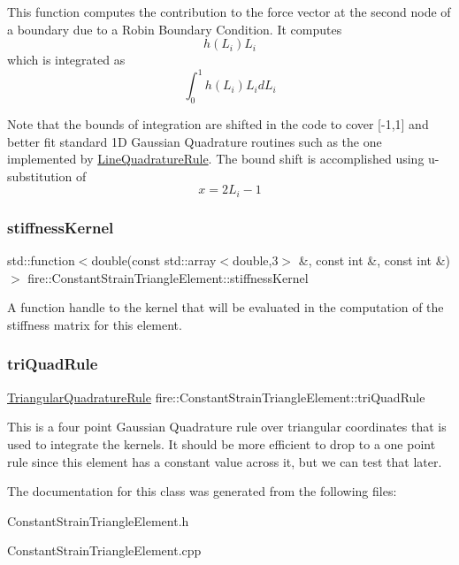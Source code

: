 This function computes the contribution to the force vector at the second node of a boundary due to a Robin Boundary Condition. It computes \[ h(L_{i})L_{i} \] which is integrated as \[ \int_{0}^{1} h(L_{i})L_{i}dL_{i} \]

Note that the bounds of integration are shifted in the code to cover \mbox{[}-\/1,1\mbox{]} and better fit standard 1D Gaussian Quadrature routines such as the one implemented by \hyperlink{a00885}{Line\+Quadrature\+Rule}. The bound shift is accomplished using u-\/substitution of \[ x = 2L_{i} - 1 \] \mbox{\label{a00789_ae2480b5335fe78245cb1006e3eeb034d}} 
\subsubsection{\texorpdfstring{stiffness\+Kernel}{stiffnessKernel}}
{\footnotesize\ttfamily std\+::function$<$double(const std\+::array$<$double,3$>$ \&, const int \&, const int \&)$>$ fire\+::\+Constant\+Strain\+Triangle\+Element\+::stiffness\+Kernel\hspace{0.3cm}{\ttfamily [protected]}}

A function handle to the kernel that will be evaluated in the computation of the stiffness matrix for this element. \mbox{\label{a00789_a5e50303ae2cfb783f44de143be8a9aac}} 
\subsubsection{\texorpdfstring{tri\+Quad\+Rule}{triQuadRule}}
{\footnotesize\ttfamily \hyperlink{a00889}{Triangular\+Quadrature\+Rule} fire\+::\+Constant\+Strain\+Triangle\+Element\+::tri\+Quad\+Rule\hspace{0.3cm}{\ttfamily [protected]}}

This is a four point Gaussian Quadrature rule over triangular coordinates that is used to integrate the kernels. It should be more efficient to drop to a one point rule since this element has a constant value across it, but we can test that later. 

The documentation for this class was generated from the following files\+:\begin{DoxyCompactItemize}
\item 
Constant\+Strain\+Triangle\+Element.\+h\item 
Constant\+Strain\+Triangle\+Element.\+cpp\end{DoxyCompactItemize}
